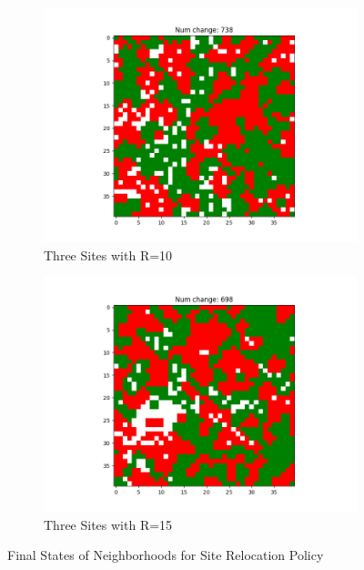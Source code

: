 \documentclass[11pt]{article}
\begin{document}
\begin{figure}[h]
\begin{subfigure}{0.14\textwidth}
			\includegraphics[width=\linewidth]{policy3_final_h3r10.png}
			\caption{\centering Three Sites with R=10}
		\end{subfigure}\hfill
		\begin{subfigure}{0.14\textwidth}
			\includegraphics[width=\linewidth]{policy3_final_h3r15.png}
			\caption{\centering Three Sites with R=15}
		\end{subfigure}
		\caption{Final States of Neighborhoods for Site Relocation Policy}
	\end{figure}
	\FloatBarrier
	
\end{document}
